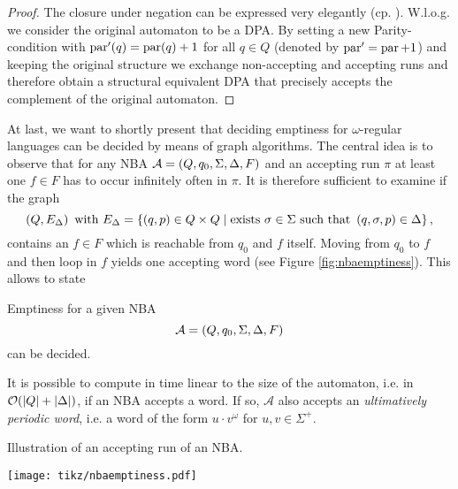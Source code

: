 \begin{proof}
  The closure under negation can be expressed very elegantly (cp.
  \cite[Transformation 1.25.]{AutoLogInfGames}). W.l.o.g. we consider the
  original automaton to be a \ac{DPA}. By setting a new Parity-condition with
  $\operatorname{par}'(q) = \operatorname{par}(q) + 1$ for all $q\in Q$ (denoted by
  $\operatorname{par}' = \operatorname{par} + 1$) and keeping the original structure we exchange
  non-accepting and accepting runs and therefore obtain a structural equivalent
  \ac{DPA} that precisely accepts the complement of the original automaton.
\end{proof}

At last, we want to shortly present that deciding emptiness for
$\omega$-regular languages can be decided by means of graph algorithms. The
central idea is to observe that for any \ac{NBA}
$\mathcal{A} = \left(Q, q_{0}, \Sigma, \Delta, F\right)$ and an accepting run $\pi$
at least one $f\in F$ has to occur infinitely often in $\pi$. It is therefore
sufficient to examine if the graph
\begin{equation*}
  \left(Q, E_{\Delta}\right)\text{ with }
  E_{\Delta} = \left\{
    \left(q, p\right)\in Q\times Q\mid\text{exists }\sigma\in\Sigma
      \text{ such that }\left(q,\sigma,p\right)\in\Delta
  \right\},
\end{equation*}
contains an $f\in F$ which is reachable from $q_{0}$ and $f$ itself. Moving
from $q_{0}$ to $f$ and then loop in $f$ yields one accepting word (see Figure
\ref{fig:nbaemptiness}). This allows to state
\begin{theorem}
  \cite{DecMethRestArith,Tarjan}
  Emptiness for a given \ac{NBA}
  \begin{equation*}
    \mathcal{A} = \left(Q, q_{0}, \Sigma, \Delta, F\right)
  \end{equation*}
  can be decided. 

  It is possible to compute in time linear to the size of the automaton, i.e.
  in $\mathcal{O}(\left\vert{Q}\right\vert+\left\vert{\Delta}\right\vert)$, if an \ac{NBA} accepts a word. If
  so, $\mathcal{A}$ also accepts an \emph{ultimatively periodic word}, i.e. a
  word of the form $u\cdot v^{\omega}$ for $u, v\in\Sigma^{+}$.
  \label{thm:nbaemptiness}
\end{theorem}

\begin{drawing}
    \caption{Illustration of an accepting run of an \ac{NBA}.}
    \label{fig:nbaemptiness}
    \begin{center}
      \texttt{[image: tikz/nbaemptiness.pdf]}
    \end{center}
\end{drawing}%
